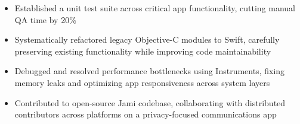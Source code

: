 \begin{itemize}
    \item Established a unit test suite across critical app functionality, cutting manual QA time by 20\%
    \item Systematically refactored legacy Objective-C modules to Swift, carefully preserving existing functionality while improving code maintainability
    \item Debugged and resolved performance bottlenecks using Instruments, fixing memory leaks and optimizing app responsiveness across system layers
    \item Contributed to open-source Jami codebase, collaborating with distributed contributors across platforms on a privacy-focused communications app
\end{itemize}
